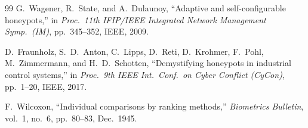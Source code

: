 \documentclass[journal]{IEEEtran}
\begin{document}
\begin{thebibliography}{99}
G.~Wagener, R.~State, and A.~Dulaunoy,
``Adaptive and self-configurable honeypots,''
in \emph{Proc.\ 11th IFIP/IEEE Integrated Network Management Symp.\
(IM)}, pp.~345--352, IEEE, 2009.

D.~Fraunholz, S.~D.~Anton, C.~Lipps, D.~Reti, D.~Krohmer,
F.~Pohl, M.~Zimmermann, and H.~D.~Schotten,
``Demystifying honeypots in industrial control systems,''
in \emph{Proc.\ 9th IEEE Int.\ Conf.\ on Cyber Conflict (CyCon)},
pp.~1--20, IEEE, 2017.

F.~Wilcoxon,
``Individual comparisons by ranking methods,''
\emph{Biometrics Bulletin}, vol.~1, no.~6, pp.~80--83, Dec.\ 1945.

\end{thebibliography}
\end{document}
